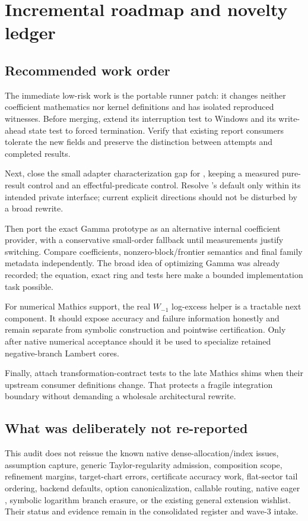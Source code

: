 \documentclass[11pt,letterpaper]{article}
\newcommand{\code}[1]{\texttt{\detokenize{#1}}}
\begin{document}
\section{Incremental roadmap and novelty ledger}
\subsection{Recommended work order}
The immediate low-risk work is the portable runner patch: it changes neither coefficient mathematics nor kernel definitions and has isolated reproduced witnesses. Before merging, extend its interruption test to Windows and its write-ahead state test to forced termination. Verify that existing report consumers tolerate the new fields and preserve the distinction between attempts and completed results.

Next, close the small adapter characterization gap for \code{FirstPosition}, keeping a measured pure-result control and an effectful-predicate control. Resolve \code{Limit}'s default only within its intended private interface; current explicit directions should not be disturbed by a broad rewrite.

Then port the exact Gamma prototype as an alternative internal coefficient provider, with a conservative small-order fallback until measurements justify switching. Compare coefficients, nonzero-block/frontier semantics and final family metadata independently. The broad idea of optimizing Gamma was already recorded; the equation, exact ring and tests here make a bounded implementation task possible.

For numerical Mathics support, the real $W_{-1}$ log-excess helper is a tractable next component. It should expose accuracy and failure information honestly and remain separate from symbolic construction and pointwise certification. Only after native numerical acceptance should it be used to specialize retained negative-branch Lambert cores.

Finally, attach transformation-contract tests to the late Mathics shims when their upstream consumer definitions change. That protects a fragile integration boundary without demanding a wholesale architectural rewrite.

\subsection{What was deliberately not re-reported}
This audit does not reissue the known native dense-allocation/index issues, assumption capture, generic Taylor-regularity admission, composition scope, refinement margins, target-chart errors, certificate accuracy work, flat-sector tail ordering, backend defaults, option canonicalization, callable routing, native eager \code{Normal}, symbolic logarithm branch erasure, or the existing general extension wishlist. Their status and evidence remain in the consolidated register and wave-3 intake.\cite{register,wave3}
\end{document}
